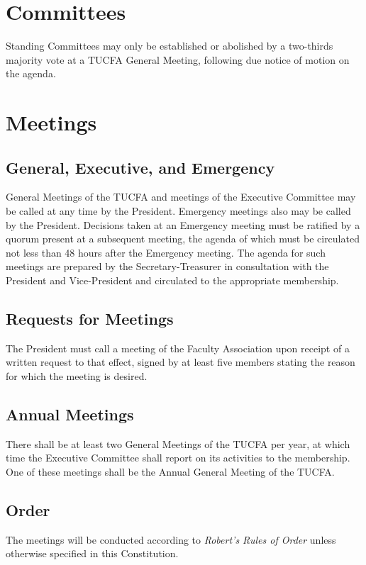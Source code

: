 \documentclass[12pt]{article}
\begin{document}
\section{Committees}

Standing Committees may only be established or abolished by a two-thirds majority vote at a TUCFA General Meeting, following due notice of motion on the agenda.

\section{Meetings}

\subsection{General, Executive, and Emergency}
General Meetings of the TUCFA and meetings of the Executive Committee may be called at any time by the President. Emergency meetings also may be called by the President. Decisions taken at an Emergency meeting must be ratified by a quorum present at a subsequent meeting, the agenda of which must be circulated not less than 48 hours after the Emergency meeting. The agenda for such meetings are prepared by the Secretary-Treasurer in consultation with the President and Vice-President and circulated to the appropriate membership.

\subsection{Requests for Meetings}
The President must call a meeting of the Faculty Association upon receipt of a written request to that effect, signed by at least five members stating the reason for which the meeting is desired.

\subsection{Annual Meetings}
There shall be at least two General Meetings of the TUCFA per year, at which time the Executive Committee shall report on its activities to the membership. One of these meetings shall be the Annual General Meeting of the TUCFA.

\subsection{Order}
The meetings will be conducted according to \emph{Robert's Rules of Order} unless otherwise specified in this Constitution.
\end{document}
